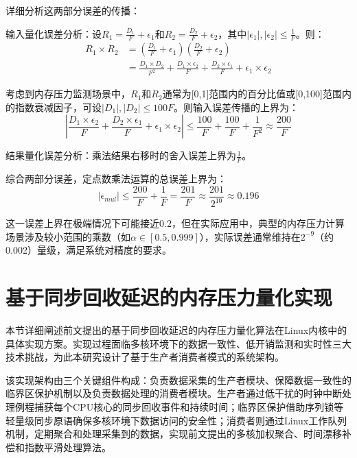 详细分析这两部分误差的传播：

输入量化误差分析：设$R_1 = \frac{D_1}{F} + \epsilon_1$和$R_2 = \frac{D_2}{F} + \epsilon_2$，其中$|\epsilon_1|, |\epsilon_2| \leq \frac{1}{F}$。则：
\[
\begin{aligned}
R_1 \times R_2 &= (\frac{D_1}{F} + \epsilon_1)(\frac{D_2}{F} + \epsilon_2) \\
&= \frac{D_1 \times D_2}{F^2} + \frac{D_1 \times \epsilon_2}{F} + \frac{D_2 \times \epsilon_1}{F} + \epsilon_1 \times \epsilon_2
\end{aligned}
\]

考虑到内存压力监测场景中，$R_1$和$R_2$通常为[0,1]范围内的百分比值或[0,100]范围内的指数衰减因子，可设$|D_1|, |D_2| \leq 100F$。则输入误差传播的上界为：
\begin{equation}
|\frac{D_1 \times \epsilon_2}{F} + \frac{D_2 \times \epsilon_1}{F} + \epsilon_1 \times \epsilon_2| \leq \frac{100}{F} + \frac{100}{F} + \frac{1}{F^2} \approx \frac{200}{F}
\end{equation}

结果量化误差分析：乘法结果右移时的舍入误差上界为$\frac{1}{F}$。

综合两部分误差，定点数乘法运算的总误差上界为：
\begin{equation}
|\epsilon_{mul}| \leq \frac{200}{F} + \frac{1}{F} = \frac{201}{F} \approx \frac{201}{2^{10}} \approx 0.196    
\end{equation}

这一误差上界在极端情况下可能接近0.2，但在实际应用中，典型的内存压力计算场景涉及较小范围的乘数（如\(\alpha \in [0.5, 0.999]\)），实际误差通常维持在\(2^{-9}\)（约0.002）量级，满足系统对精度的要求。

\section{基于同步回收延迟的内存压力量化实现}
\label{sec:基于同步回收延迟的内存压力量化实现}

本节详细阐述前文提出的基于同步回收延迟的内存压力量化算法在Linux内核中的具体实现方案。实现过程面临多核环境下的数据一致性、低开销监测和实时性三大技术挑战，为此本研究设计了基于生产者消费者模式的系统架构。

该实现架构由三个关键组件构成：负责数据采集的生产者模块、保障数据一致性的临界区保护机制以及负责数据处理的消费者模块。生产者通过低干扰的时钟中断处理例程捕获每个CPU核心的同步回收事件和持续时间；临界区保护借助序列锁等轻量级同步原语确保多核环境下数据访问的安全性；消费者则通过Linux工作队列机制，定期聚合和处理采集到的数据，实现前文提出的多核加权聚合、时间漂移补偿和指数平滑处理算法。

